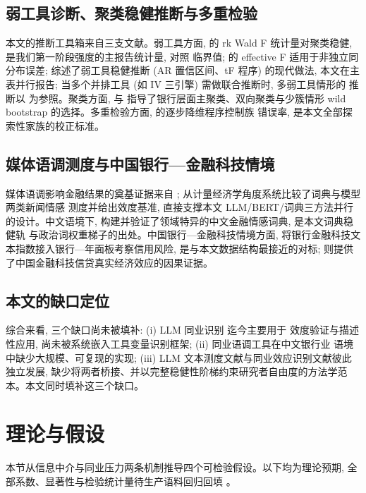 \subsection{弱工具诊断、聚类稳健推断与多重检验}
本文的推断工具箱来自三支文献。弱工具方面, \textcite{kleibergen2006rank} 的 rk Wald F
统计量对聚类稳健, 是我们第一阶段强度的主报告统计量, 对照 \textcite{stock2005weak}
临界值; \textcite{montielolea2013weak} 的 effective F 适用于非独立同分布误差;
\textcite{andrews2019weakiv} 综述了弱工具稳健推断 (AR 置信区间、tF 程序) 的现代做法,
本文在主表并行报告; 当多个并排工具 (如 IV 三引擎) 需做联合推断时, 多弱工具情形的
推断以 \textcite{mikusheva2022manyweak} 为参照。聚类方面, \textcite{mackinnon2023cluster} 与
\textcite{cameron2015practitioner} 指导了银行层面主聚类、双向聚类与少簇情形 wild
bootstrap 的选择。多重检验方面, \textcite{romano2005stepdown} 的逐步降维程序控制族
错误率, 是本文全部探索性家族的校正标准。

\subsection{媒体语调测度与中国银行—金融科技情境}
媒体语调影响金融结果的奠基证据来自 \textcite{tetlock2007media};
\textcite{shapiro2022newssentiment} 从计量经济学角度系统比较了词典与模型两类新闻情感
测度并给出效度基准, 直接支撑本文 LLM/BERT/词典三方法并行的设计。中文语境下,
\textcite{du2022chinesedict} 构建并验证了领域特异的中文金融情感词典, 是本文词典稳健轨
与政治词权重梯子的出处。中国银行—金融科技情境方面, \textcite{cheng2020bankfintech}
将银行金融科技文本指数接入银行—年面板考察信用风险, 是与本文数据结构最接近的对标;
\textcite{hau2024fintechcredit} 则提供了中国金融科技信贷真实经济效应的因果证据。

\subsection{本文的缺口定位}
综合来看, 三个缺口尚未被填补: (i) LLM 同业识别 \parencite{cao2025genai} 迄今主要用于
效度验证与描述性应用, 尚未被系统嵌入工具变量识别框架; (ii) 同业语调工具在中文银行业
语境中缺少大规模、可复现的实现; (iii) LLM 文本测度文献与同业效应识别文献彼此独立发展,
缺少将两者桥接、并以完整稳健性阶梯约束研究者自由度的方法学范本。本文同时填补这三个缺口。

\section{理论与假设}\label{sec:theory}

本节从信息中介与同业压力两条机制推导四个可检验假设。以下均为理论预期,
全部系数、显著性与检验统计量待生产语料回归回填 。


